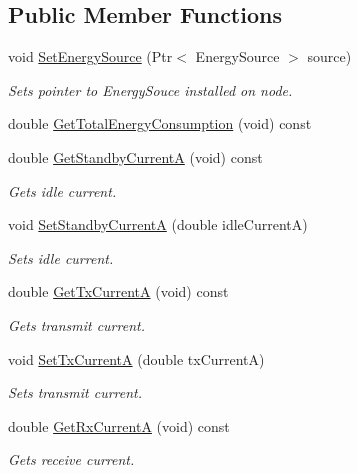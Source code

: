 \subsection*{Public Member Functions}
\begin{DoxyCompactItemize}
\item 
void \hyperlink{classns3_1_1lorawan_1_1LoraRadioEnergyModel_a871b6cd0b3c0505c2be884599e85929b}{Set\+Energy\+Source} (Ptr$<$ Energy\+Source $>$ source)
\begin{DoxyCompactList}\small\item\em Sets pointer to Energy\+Souce installed on node. \end{DoxyCompactList}\item 
double \hyperlink{classns3_1_1lorawan_1_1LoraRadioEnergyModel_ad9ec43f91272ff72606281bca23c15ae}{Get\+Total\+Energy\+Consumption} (void) const
\item 
double \hyperlink{classns3_1_1lorawan_1_1LoraRadioEnergyModel_aac27a85a815b2d7bc50a85a7d014c6ca}{Get\+Standby\+CurrentA} (void) const
\begin{DoxyCompactList}\small\item\em Gets idle current. \end{DoxyCompactList}\item 
void \hyperlink{classns3_1_1lorawan_1_1LoraRadioEnergyModel_a4a0211bc19870f3b4940f6b7b08a0616}{Set\+Standby\+CurrentA} (double idle\+CurrentA)
\begin{DoxyCompactList}\small\item\em Sets idle current. \end{DoxyCompactList}\item 
double \hyperlink{classns3_1_1lorawan_1_1LoraRadioEnergyModel_ab468b8f51d83a402deec1fee502d1ffb}{Get\+Tx\+CurrentA} (void) const
\begin{DoxyCompactList}\small\item\em Gets transmit current. \end{DoxyCompactList}\item 
void \hyperlink{classns3_1_1lorawan_1_1LoraRadioEnergyModel_ac25339a3bd35ba6bc40c866d147ebbef}{Set\+Tx\+CurrentA} (double tx\+CurrentA)
\begin{DoxyCompactList}\small\item\em Sets transmit current. \end{DoxyCompactList}\item 
double \hyperlink{classns3_1_1lorawan_1_1LoraRadioEnergyModel_af71e644f848fa5d758fdbe58f8b996d8}{Get\+Rx\+CurrentA} (void) const
\begin{DoxyCompactList}\small\item\em Gets receive current. \end{DoxyCompactList}\item 

\end{DoxyCompactItemize}
